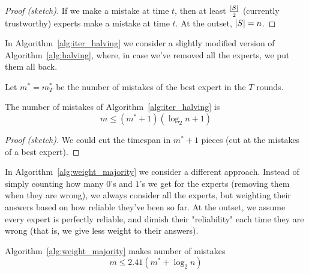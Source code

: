     \begin{proof}[Proof (sketch)]
        If we make a mistake at time $t$, then at least $\frac{\vert S \vert}{2}$ (currently trustworthy) experts make a mistake at time $t$.
        At the outset, $\vert S \vert = n$.
    \end{proof}

    In Algorithm~\ref{alg:iter_halving} we consider a slightly modified version of Algorithm~\ref{alg:halving}, where, in case we've removed all the experts, we put them all back.

    

    Let $m^* = m_T^*$ be the number of mistakes of the best expert in the $T$ rounds.

    \begin{theorem}
        The number of mistakes of Algorithm~\ref{alg:iter_halving} is
        \[ m \leq (m^* + 1)(\log_2 n + 1) \]
    \end{theorem}

    \begin{proof}[Proof (sketch)]
        We could cut the timespan in $m^* + 1$ pieces (cut at the mistakes of a best expert).
    \end{proof}

    In Algorithm~\ref{alg:weight_majority} we consider a different approach.
    Instead of simply counting how many $0$'s and $1$'s we get for the experts (removing them when they are wrong), we always consider all the experts, but weighting their answers based on how reliable they've been so far.
    At the outset, we assume every expert is perfectly reliable, and dimish their "reliability" each time they are wrong (that is, we give less weight to their answers).

    

    \begin{theorem}
        Algorithm~\ref{alg:weight_majority} makes number of mistakes
        \[ m \leq 2.41(m^* + \log_2 n) \]
    \end{theorem}

